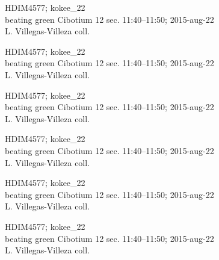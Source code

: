 \documentclass[2pt]{extarticle}
\begin{document}
\noindent
\parbox{0.16\textwidth}{\tiny \raggedright \rule[-0.3\baselineskip]{0pt}{10pt}HDIM4577; kokee\_22\\ beating green Cibotium 12 sec. 11:40--11:50; 2015-aug-22\\ L. Villegas-Villeza coll.}
\parbox{0.16\textwidth}{\tiny \raggedright \rule[-0.3\baselineskip]{0pt}{10pt}HDIM4577; kokee\_22\\ beating green Cibotium 12 sec. 11:40--11:50; 2015-aug-22\\ L. Villegas-Villeza coll.}
\parbox{0.16\textwidth}{\tiny \raggedright \rule[-0.3\baselineskip]{0pt}{10pt}HDIM4577; kokee\_22\\ beating green Cibotium 12 sec. 11:40--11:50; 2015-aug-22\\ L. Villegas-Villeza coll.}
\parbox{0.16\textwidth}{\tiny \raggedright \rule[-0.3\baselineskip]{0pt}{10pt}HDIM4577; kokee\_22\\ beating green Cibotium 12 sec. 11:40--11:50; 2015-aug-22\\ L. Villegas-Villeza coll.}
\parbox{0.16\textwidth}{\tiny \raggedright \rule[-0.3\baselineskip]{0pt}{10pt}HDIM4577; kokee\_22\\ beating green Cibotium 12 sec. 11:40--11:50; 2015-aug-22\\ L. Villegas-Villeza coll.}
\parbox{0.16\textwidth}{\tiny \raggedright \rule[-0.3\baselineskip]{0pt}{10pt}HDIM4577; kokee\_22\\ beating green Cibotium 12 sec. 11:40--11:50; 2015-aug-22\\ L. Villegas-Villeza coll.} \\ 
\vspace{0.001in} 
\end{document}
